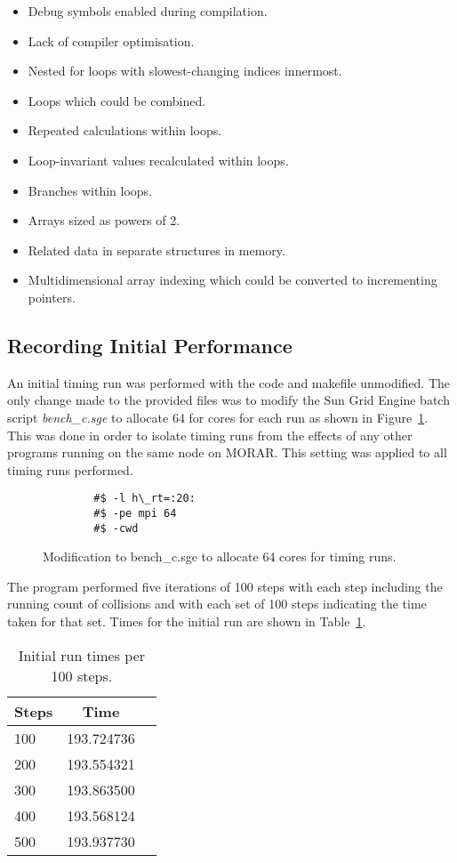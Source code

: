 \documentclass[11pt, oneside]{article}   %
\begin{document}
\begin{itemize}
	\item Debug symbols enabled during compilation.
	\item Lack of compiler optimisation.
	\item Nested for loops with slowest-changing indices innermost.
	\item Loops which could be combined.
	\item Repeated calculations within loops.
	\item Loop-invariant values recalculated within loops.
	\item Branches within loops.
	\item Arrays sized as powers of 2.
	\item Related data in separate structures in memory.
	\item Multidimensional array indexing which could be converted to incrementing pointers.
\end{itemize}


\subsection{Recording Initial Performance}
An initial timing run was performed with the code and makefile unmodified.
The only change made to the provided files was to modify the Sun Grid Engine batch script {\em bench\_c.sge} to allocate 64 for cores for each run as shown in Figure~\ref{fig:batchsge}.
This was done in order to isolate timing runs from the effects of any other programs running on the same node on MORAR.
This setting was applied to all timing runs performed.

\begin{figure}
	\begin{lstlisting}
		#$ -l h\_rt=:20:
		#$ -pe mpi 64
		#$ -cwd
	\end{lstlisting}
	\caption{Modification to bench\_c.sge to allocate 64 cores for timing runs.}
	\label{fig:batchsge}
\end{figure}

The program performed five iterations of 100 steps with each step including the running count of collisions and with each set of 100 steps indicating the time taken for that set.
Times for the initial run are shown in Table~\ref{table:InitialRunTimes}.

\begin{table}[h]
	\begin{center}
		\begin{tabular}{||l|c|l||}
			\hline
				{\bf Steps} & {\bf Time}\\
			\hline
				100  &  193.724736\\
				200  &  193.554321\\
				300  &  193.863500\\
				400  &  193.568124\\
				500  &  193.937730\\
			\hline
		\end{tabular}
	\end{center}
	\caption{Initial run times per 100 steps.}
	\label{table:InitialRunTimes}
\end{table}
\end{document}
